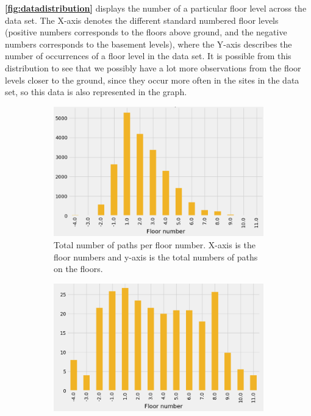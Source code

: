\textbf{\autoref{fig:datadistribution}} displays the number of a particular floor level across the data set. The X-axis denotes the different standard numbered floor levels (positive numbers corresponds to the floors above ground, and the negative numbers corresponds to the basement levels), where the Y-axis describes the number of occurrences of a floor level in the data set. It is possible from this distribution to see that we possibly have a lot more observations from the floor levels closer to the ground, since they occur more often in the sites in the data set, so this data is also represented in the graph. %

\begin{figure}[H]
     \centering
     \begin{subfigure}[b]{0.49\textwidth}
         \centering
         \includegraphics[width=\textwidth]{Images/ProblemAnalysis/datadistribution7.png}
         \caption{Total number of paths per floor number. X-axis is the floor numbers and y-axis is the total numbers of paths on the floors.}
         \label{fig:totalpath}
     \end{subfigure}
     \hfill
     \begin{subfigure}[b]{0.47\textwidth}
         \centering
         \includegraphics[width=\textwidth]{Images/ProblemAnalysis/datadistribution8.png}

\end{subfigure}
\end{figure}
